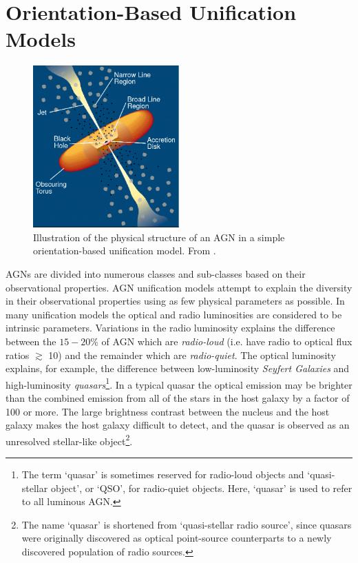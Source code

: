 \section{Orientation-Based Unification Models}

\begin{figure}
  \centering
  \includegraphics[width=0.5\textwidth]{figures/chapter06/urry_model}
  \caption{Illustration of the physical structure of an AGN in a simple orientation-based unification model. From \citet{urry95}.}
  \label{fig:agnmodel}
\end{figure}

AGNs are divided into numerous classes and sub-classes based on their observational properties. 
AGN unification models \citep{antonucci93,urry95} attempt to explain the diversity in their observational properties using as few physical parameters as possible. 
In many unification models the optical and radio luminosities are considered to be intrinsic parameters. Variations in the radio luminosity explains the difference between the $15-20\%$ of AGN which are {\it radio-loud} (i.e. have radio to optical flux ratios $\gtrsim$ 10) and the remainder which are {\it radio-quiet}. 
The optical luminosity explains, for example, the difference between low-luminosity {\it Seyfert Galaxies} and high-luminosity {\it quasars}\footnote{The term `quasar' is sometimes reserved for radio-loud objects and `quasi-stellar object', or `QSO', for radio-quiet objects. Here, `quasar' is used to refer to all luminous AGN.}.
In a typical quasar the optical emission may be brighter than the combined emission from all of the stars in the host galaxy by a factor of 100 or more. 
The large brightness contrast between the nucleus and the host galaxy makes the host galaxy difficult to detect, and the quasar is observed as an unresolved stellar-like object\footnote{The name `quasar' is shortened from `quasi-stellar radio source', since quasars were originally discovered as optical point-source counterparts to a newly discovered population of radio sources.}.   

